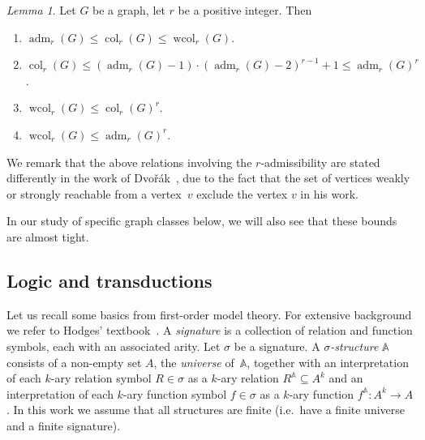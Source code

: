 \documentclass[1p,number,a4paper]{elsarticle}
\theoremstyle{remark}
\newcommand{\strA}{\mathbb{A}}
\DeclareMathOperator{\col}{col}
\DeclareMathOperator{\wcol}{wcol}
\DeclareMathOperator{\adm}{adm}
\newtheorem{lemma}[theorem]{Lemma}
\begin{document}

\begin{lemma}\label{lem:adm-col-wcol}
Let $G$ be a graph, let $r$ be a positive integer. 
Then 
\begin{enumerate}
\item $\adm_r(G)\leq \col_r(G)\leq\wcol_r(G)$. 
\item $\col_r(G)\leq (\adm_r(G)-1)\cdot(\adm_r(G)-2)^{r-1}+1 \leq \adm_r(G)^r$.
\item $\wcol_r(G)\leq \col_r(G)^r$.
\item $\wcol_r(G)\leq \adm_r(G)^r$.
\end{enumerate}
\end{lemma}

We remark that the above relations involving the 
$r$-admissibility are stated differently in the work of Dvo\v{r}\'ak~\cite{dvovrak2013constant}, due to 
the fact that the set of vertices weakly or strongly reachable 
from a vertex~$v$ exclude the vertex $v$ in his work. 

\medskip
In our study of specific graph classes below, we will also see that these bounds are almost tight. 


\subsection{Logic and transductions}\label{sec:logic}

Let us recall some basics from first-order model theory. For extensive background we refer to Hodges' textbook~\cite{hodges1993model}. 
A \emph{signature} is a collection
of relation and function symbols, each with an associated arity. Let $\sigma$ be a
signature. A {\em $\sigma$-structure} $\strA$ consists of a non-empty
set $A$, the \emph{universe} of~$\strA$, together with an interpretation of
each $k$-ary relation symbol $R\in\sigma$ as a $k$-ary relation
$R^\strA\subseteq A^k$ and an interpretation of each $k$-ary function symbol $f\in \sigma$ as a $k$-ary function $f^\strA:A^k\rightarrow A$. 
In this work we assume that all structures are finite (i.e.\ have a finite universe and a finite signature). 
\end{document}
